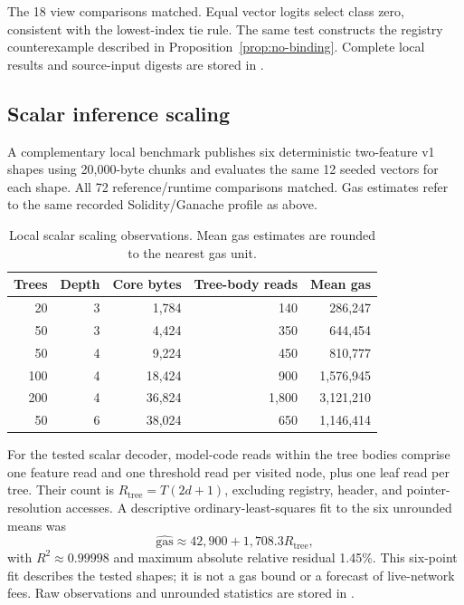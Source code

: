 \documentclass[10pt,a4paper]{article}
\theoremstyle{remark}
\begin{document}
The 18 view comparisons matched. Equal vector logits select class zero,
consistent with the lowest-index tie rule. The same test constructs the
registry counterexample described in Proposition~\ref{prop:no-binding}.
Complete local results and source-input digests are stored in
.

\subsection{Scalar inference scaling}
\label{sec:supp-scaling}

A complementary local benchmark publishes six deterministic two-feature v1
shapes using 20,000-byte chunks and evaluates the same 12 seeded vectors for
each shape. All 72 reference/runtime comparisons matched. Gas estimates
refer to the same recorded Solidity/Ganache profile as above.

\begin{table}[htbp]
\centering
\caption{Local scalar scaling observations. Mean gas estimates are rounded
to the nearest gas unit.}
\label{tab:supp-evm-scaling}
\begin{tabular}{rrrrr}
\toprule
Trees & Depth & Core bytes & Tree-body reads & Mean gas\\
\midrule
20  & 3 & 1,784  & 140   & 286,247\\
50  & 3 & 4,424  & 350   & 644,454\\
50  & 4 & 9,224  & 450   & 810,777\\
100 & 4 & 18,424 & 900   & 1,576,945\\
200 & 4 & 36,824 & 1,800 & 3,121,210\\
50  & 6 & 38,024 & 650   & 1,146,414\\
\bottomrule
\end{tabular}
\end{table}

For the tested scalar decoder, model-code reads within the tree bodies
comprise one feature read and one threshold read per visited node, plus one
leaf read per tree. Their count is $R_{\mathrm{tree}}=T(2d+1)$, excluding
registry, header, and pointer-resolution accesses. A descriptive
ordinary-least-squares fit to the six unrounded means was
\[
\widehat{\mathrm{gas}}\approx42{,}900+1{,}708.3R_{\mathrm{tree}},
\]
with $R^2\approx0.99998$ and maximum absolute relative residual 1.45\%.
This six-point fit describes the tested shapes; it is not a gas bound or a
forecast of live-network fees. Raw observations and unrounded statistics are
stored in .
\end{document}

